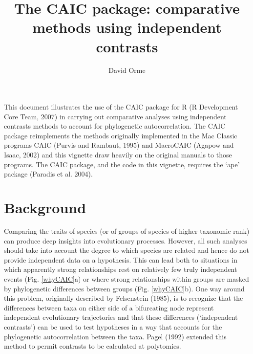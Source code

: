 \documentclass[a4paper]{article}
\title{The CAIC package: comparative methods using independent contrasts}
\author{David Orme}
\begin{document}
\maketitle

This document illustrates the use of the CAIC package for R (R Development Core Team, 2007) in carrying out comparative analyses using independent contrasts methods to account for phylogenetic autocorrelation. The CAIC package reimplements the methods originally implemented in the Mac Classic programs CAIC (Purvis and Rambaut, 1995) and MacroCAIC  (Agapow and Isaac, 2002) and this vignette draw heavily on the original manuals to those programs. The CAIC package, and the code in this vignette, requires the `ape' package (Paradis et al. 2004).

\section{Background}
Comparing the traits of species (or of groups of species of higher taxonomic rank) can produce deep insights into evolutionary processes. However, all such analyses should take into account the degree to which species are related and hence do not provide independent data on a hypothesis. This can lead both to situations in which apparently strong relationships rest on relatively few truly independent events (Fig. \ref{whyCAIC}a) or where strong relationships within groups are masked by phylogenetic differences between groups (Fig. \ref{whyCAIC}b). One way around this problem, originally described by Felsenstein (1985), is to recognize that the differences between taxa on either side of a bifurcating node represent independent evolutionary trajectories and that these differences (`independent contrasts') can be used to test hypotheses in a way that accounts for the phylogenetic autocorrelation between the taxa. Pagel (1992) extended this method to permit contrasts to be calculated at polytomies.
\end{document}
